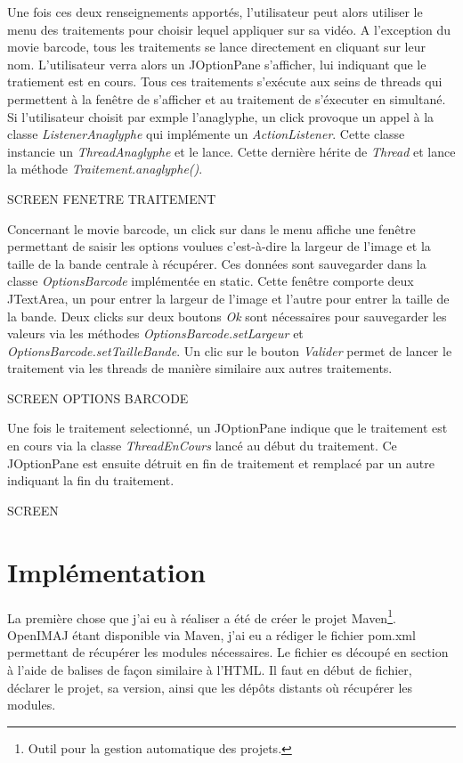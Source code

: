 \documentclass[10pt,a4paper]{article}
\begin{document}
Une fois ces deux renseignements apportés, l'utilisateur peut alors utiliser le menu des traitements pour choisir lequel appliquer sur sa vidéo. A l'exception du movie barcode, tous les traitements se lance directement en cliquant sur leur nom. L'utilisateur verra alors un JOptionPane s'afficher, lui indiquant que le tratiement est en cours. Tous ces traitements s'exécute aux seins de threads qui permettent à la fenêtre de s'afficher et au traitement de s'éxecuter en simultané. Si l'utilisateur choisit par exmple l'anaglyphe, un click provoque un appel à la classe \textit{ListenerAnaglyphe} qui implémente un \textit{ActionListener}. Cette classe instancie un \textit{ThreadAnaglyphe} et le lance. Cette dernière hérite de \textit{Thread} et lance la méthode \textit{Traitement.anaglyphe()}. 

SCREEN FENETRE TRAITEMENT

Concernant le movie barcode, un click sur dans le menu affiche une fenêtre permettant de saisir les options voulues c'est-à-dire la largeur de l'image et la taille de la bande centrale à récupérer. Ces données sont sauvegarder dans la classe \textit{OptionsBarcode} implémentée en static. Cette fenêtre comporte deux JTextArea, un pour entrer la largeur de l'image et l'autre pour entrer la taille de la bande. Deux clicks sur deux boutons \textit{Ok} sont nécessaires pour sauvegarder les valeurs via les méthodes \textit{OptionsBarcode.setLargeur} et \textit{OptionsBarcode.setTailleBande}. Un clic sur le bouton \textit{Valider} permet de lancer le traitement via les threads de manière similaire aux autres traitements.

SCREEN OPTIONS BARCODE

Une fois le traitement selectionné, un JOptionPane indique que le traitement est en cours via la classe \textit{ThreadEnCours} lancé au début du traitement. Ce JOptionPane est ensuite détruit en fin de traitement et remplacé par un autre indiquant la fin du traitement.

SCREEN



\section{Implémentation}

La première chose que j'ai eu à réaliser a été de créer le projet Maven\footnote{Outil pour la gestion automatique des projets.}. OpenIMAJ étant disponible via Maven,
j'ai eu a rédiger le fichier pom.xml permettant de récupérer les modules nécessaires. Le fichier es découpé en section à l'aide de balises de façon similaire à l'HTML. Il faut en début de fichier,
déclarer le projet, sa version, ainsi que les dépôts distants où récupérer les modules. \newpage
\end{document}
